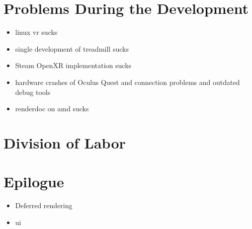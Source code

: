 \label{sec:problems}
\section{Problems During the Development}
\begin{itemize}
    \item linux vr sucks
    \item single development of treadmill sucks
    \item Steam OpenXR implementation sucks
    \item hardware crashes of Oculus Quest and connection problems and outdated debug tools
    \item renderdoc on amd sucks
\end{itemize}
\newpage
\section{Division of Labor}
\section{Epilogue}
\begin{itemize}
    \item Deferred rendering
    \item ui
\end{itemize}